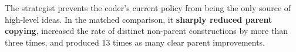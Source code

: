
The strategist prevents the coder's current policy from being the only source
of high-level ideas. In the matched comparison, it \textbf{sharply reduced parent
copying}, increased the rate of distinct non-parent constructions by more than
three times, and produced 13 times as many clear parent improvements. 
